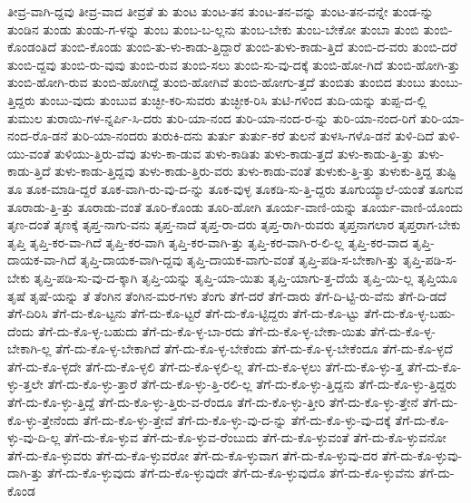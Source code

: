 {ತೀವ್ರ-ವಾಗಿ-ದ್ದವು
ತೀವ್ರ-ವಾದ
ತೀವ್ರತೆ
ತು
ತುಂಟ
ತುಂಟ-ತನ
ತುಂಟ-ತನ-ವನ್ನು
ತುಂಟ-ತನ-ವನ್ನೇ
ತುಂಡ-ನ್ನು
ತುಂಡಿನ
ತುಂಡು
ತುಂಡು-ಗ-ಳನ್ನು
ತುಂಬ
ತುಂಬ-ಬ-ಲ್ಲನು
ತುಂಬ-ಬೇಕು
ತುಂಬ-ಬೇಕೋ
ತುಂಬಾ
ತುಂಬಿ
ತುಂಬಿ-ಕೊಂಡಂತಿದೆ
ತುಂಬಿ-ಕೊಂಡು
ತುಂಬಿ-ತು-ಳು-ಕಾಡು-ತ್ತಿದ್ದಾರೆ
ತುಂಬಿ-ತುಳು-ಕಾಡು-ತ್ತಿದೆ
ತುಂಬಿ-ದ-ವರು
ತುಂಬಿ-ದರೆ
ತುಂಬಿ-ದ್ದವು
ತುಂಬಿ-ರು-ವುವು
ತುಂಬಿ-ರುವ
ತುಂಬಿ-ಸಲು
ತುಂಬಿ-ಸು-ವು-ದಕ್ಕೆ
ತುಂಬಿ-ಹೋ-ಗಿದೆ
ತುಂಬಿ-ಹೋಗಿ-ತ್ತು
ತುಂಬಿ-ಹೋಗಿ-ರುವ
ತುಂಬಿ-ಹೋಗಿದ್ದೆ
ತುಂಬಿ-ಹೋಗಿವೆ
ತುಂಬಿ-ಹೋಗು-ತ್ತದೆ
ತುಂಬಿತು
ತುಂಬಿದ
ತುಂಬು
ತುಂಬು-ತ್ತಿದ್ದರು
ತುಂಬು-ವುದು
ತುಂಬುವ
ತುಚ್ಛೀ-ಕರಿ-ಸುವರು
ತುಚ್ಛೀಕ-ರಿಸಿ
ತುಟಿ-ಗಳಿಂದ
ತುದಿ-ಯನ್ನು
ತುಪ್ಪ-ದ-ಲ್ಲಿ
ತುಮುಲ
ತುರಾಯಿ-ಗಳ-ನ್ನರ್ಪಿ-ಸಿ-ದರು
ತುರಿ-ಯಾ-ನಂದ
ತುರಿ-ಯಾ-ನಂದ-ರ-ನ್ನು
ತುರಿ-ಯಾ-ನಂದ-ರಿಗೆ
ತುರಿ-ಯಾ-ನಂದ-ರೊ-ಡನೆ
ತುರಿ-ಯಾ-ನಂದರು
ತುರುಕಿ-ದನು
ತುರ್ತು
ತುರ್ತು-ಕರೆ
ತುಲನೆ
ತುಳಸಿ-ಗಳೊ-ಡನೆ
ತುಳಿ-ದಿದೆ
ತುಳಿ-ಯು-ವಂತೆ
ತುಳಿಯು-ತ್ತಿರು-ವೆವು
ತುಳು-ಕಾ-ಡುವ
ತುಳು-ಕಾಡಿತು
ತುಳು-ಕಾಡು-ತ್ತದೆ
ತುಳು-ಕಾಡು-ತ್ತಿ-ತ್ತು
ತುಳು-ಕಾಡು-ತ್ತಿದೆ
ತುಳು-ಕಾಡು-ತ್ತಿದ್ದವು
ತುಳು-ಕಾಡು-ತ್ತಿರು-ವರು
ತುಳು-ಕಾಡು-ವಂತೆ
ತುಳುಕು-ತ್ತಿ-ತ್ತು
ತುಳುಕು-ತ್ತಿದ್ದ
ತುಷ್ಟಿ
ತೂ
ತೂಕ-ಮಾಡಿ-ದ್ದರೆ
ತೂಕ-ವಾಗಿ-ರು-ವು-ದ-ನ್ನು
ತೂಕ-ವುಳ್ಳ
ತೂಕಡಿ-ಸು-ತ್ತಿ-ದ್ದರು
ತೂಗುಯ್ಯಾಲೆ-ಯಂತೆ
ತೂಗುವ
ತೂರಾಡು-ತ್ತಿ-ತ್ತು
ತೂರಾಡು-ವಂತೆ
ತೂರಿ-ಕೊಂಡು
ತೂರಿ-ಹೋಗಿ
ತೂರ್ಯ-ವಾಣಿ-ಯನ್ನು
ತೂರ್ಯ-ವಾಣಿ-ಯೊಂದು
ತೃಣ-ದಂತೆ
ತೃಣಕ್ಕೆ
ತೃಪ್ತ-ನಾಗು-ವನು
ತೃಪ್ತ-ನಾದೆ
ತೃಪ್ತ-ರಾ-ದರು
ತೃಪ್ತ-ರಾಗಿ-ರುವರು
ತೃಪ್ತನಾಗಲಾರ
ತೃಪ್ತರಾಗ-ಬೇಕು
ತೃಪ್ತಿ
ತೃಪ್ತಿ-ಕರ-ವಾ-ಗಿದೆ
ತೃಪ್ತಿ-ಕರ-ವಾಗಿ
ತೃಪ್ತಿ-ಕರ-ವಾಗಿ-ತ್ತು
ತೃಪ್ತಿ-ಕರ-ವಾಗಿ-ರ-ಲಿ-ಲ್ಲ
ತೃಪ್ತಿ-ಕರ-ವಾದ
ತೃಪ್ತಿ-ದಾಯಕ-ವಾ-ಗಿದೆ
ತೃಪ್ತಿ-ದಾಯಕ-ವಾಗಿ-ದ್ದವು
ತೃಪ್ತಿ-ದಾಯಕ-ವಾಗು-ವಂತೆ
ತೃಪ್ತಿ-ಪಡಿ-ಸ-ಬೇಕಾಗಿ-ತ್ತು
ತೃಪ್ತಿ-ಪಡಿ-ಸ-ಬೇಕು
ತೃಪ್ತಿ-ಪಡಿ-ಸು-ವು-ದ-ಕ್ಕಾಗಿ
ತೃಪ್ತಿ-ಯನ್ನು
ತೃಪ್ತಿ-ಯಾ-ಯಿತು
ತೃಪ್ತಿ-ಯಾಗು-ತ್ತ-ದೆಯೆ
ತೃಪ್ತಿ-ಯಿ-ಲ್ಲ
ತೃಪ್ತಿಯೂ
ತೃಷೆ
ತೃಷೆ-ಯನ್ನು
ತೆ
ತೆಂಗಿನ
ತೆಂಗಿನ-ಮರ-ಗಳು
ತೆಂಗು
ತೆಗೆ-ದರೆ
ತೆಗೆ-ದಾರು
ತೆಗೆ-ದಿ-ಟ್ಟಿ-ರು-ವೆನು
ತೆಗೆ-ದಿ-ಡದೆ
ತೆಗೆ-ದಿರಿಸಿ
ತೆಗೆ-ದು-ಕೊ-ಟ್ಟನು
ತೆಗೆ-ದು-ಕೊ-ಟ್ಟರೆ
ತೆಗೆ-ದು-ಕೊ-ಟ್ಟಿದ್ದರು
ತೆಗೆ-ದು-ಕೊ-ಟ್ಟು
ತೆಗೆ-ದು-ಕೊ-ಳ್ಳ-ಬಹು-ದೆಂದು
ತೆಗೆ-ದು-ಕೊ-ಳ್ಳ-ಬಹುದು
ತೆಗೆ-ದು-ಕೊ-ಳ್ಳ-ಬಾ-ರದು
ತೆಗೆ-ದು-ಕೊ-ಳ್ಳ-ಬೇಕಾ-ಯಿತು
ತೆಗೆ-ದು-ಕೊ-ಳ್ಳ-ಬೇಕಾಗಿ-ಲ್ಲ
ತೆಗೆ-ದು-ಕೊ-ಳ್ಳ-ಬೇಕಾಗಿದೆ
ತೆಗೆ-ದು-ಕೊ-ಳ್ಳ-ಬೇಕೆಂದು
ತೆಗೆ-ದು-ಕೊ-ಳ್ಳ-ಬೇಕೆಂದೂ
ತೆಗೆ-ದು-ಕೊ-ಳ್ಳದೆ
ತೆಗೆ-ದು-ಕೊ-ಳ್ಳದೇ
ತೆಗೆ-ದು-ಕೊ-ಳ್ಳಲಿ
ತೆಗೆ-ದು-ಕೊ-ಳ್ಳಲಿ-ಲ್ಲ
ತೆಗೆ-ದು-ಕೊ-ಳ್ಳಲು
ತೆಗೆ-ದು-ಕೊ-ಳ್ಳು-ತ್ತ
ತೆಗೆ-ದು-ಕೊ-ಳ್ಳು-ತ್ತಲೇ
ತೆಗೆ-ದು-ಕೊ-ಳ್ಳು-ತ್ತಾರೆ
ತೆಗೆ-ದು-ಕೊ-ಳ್ಳು-ತ್ತಿ-ರಲಿ-ಲ್ಲ
ತೆಗೆ-ದು-ಕೊ-ಳ್ಳು-ತ್ತಿದ್ದನು
ತೆಗೆ-ದು-ಕೊ-ಳ್ಳು-ತ್ತಿದ್ದರು
ತೆಗೆ-ದು-ಕೊ-ಳ್ಳು-ತ್ತಿದ್ದೆ
ತೆಗೆ-ದು-ಕೊ-ಳ್ಳು-ತ್ತಿರು-ವ-ರೆಂದೂ
ತೆಗೆ-ದು-ಕೊ-ಳ್ಳು-ತ್ತೀರಿ
ತೆಗೆ-ದು-ಕೊ-ಳ್ಳು-ತ್ತೇನೆ
ತೆಗೆ-ದು-ಕೊ-ಳ್ಳು-ತ್ತೇನೆಂದು
ತೆಗೆ-ದು-ಕೊ-ಳ್ಳು-ತ್ತೇವೆ
ತೆಗೆ-ದು-ಕೊ-ಳ್ಳು-ವು-ದ-ನ್ನು
ತೆಗೆ-ದು-ಕೊ-ಳ್ಳು-ವು-ದಕ್ಕೆ
ತೆಗೆ-ದು-ಕೊ-ಳ್ಳು-ವು-ದಿ-ಲ್ಲ
ತೆಗೆ-ದು-ಕೊ-ಳ್ಳುವ
ತೆಗೆ-ದು-ಕೊ-ಳ್ಳುವ-ರೆಂಬುದು
ತೆಗೆ-ದು-ಕೊ-ಳ್ಳುವಂತೆ
ತೆಗೆ-ದು-ಕೊ-ಳ್ಳುವನೋ
ತೆಗೆ-ದು-ಕೊ-ಳ್ಳುವರು
ತೆಗೆ-ದು-ಕೊ-ಳ್ಳುವರೋ
ತೆಗೆ-ದು-ಕೊ-ಳ್ಳುವಾಗ
ತೆಗೆ-ದು-ಕೊ-ಳ್ಳುವು-ದರ
ತೆಗೆ-ದು-ಕೊ-ಳ್ಳುವು-ದಾಗಿ-ತ್ತು
ತೆಗೆ-ದು-ಕೊ-ಳ್ಳುವುದು
ತೆಗೆ-ದು-ಕೊ-ಳ್ಳುವುದೇ
ತೆಗೆ-ದು-ಕೊ-ಳ್ಳುವುದೊ
ತೆಗೆ-ದು-ಕೊ-ಳ್ಳುವೆನು
ತೆಗೆ-ದು-ಕೊಂಡ
}
